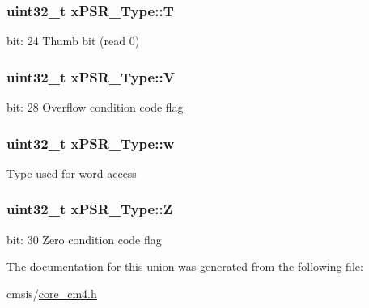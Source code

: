 \subsubsection[{\texorpdfstring{T}{T}}]{\setlength{\rightskip}{0pt plus 5cm}uint32\+\_\+t x\+P\+S\+R\+\_\+\+Type\+::T}\hypertarget{unionx_p_s_r___type_a7eed9fe24ae8d354cd76ae1c1110a658}{}\label{unionx_p_s_r___type_a7eed9fe24ae8d354cd76ae1c1110a658}
bit\+: 24 Thumb bit (read 0) 
\subsubsection[{\texorpdfstring{V}{V}}]{\setlength{\rightskip}{0pt plus 5cm}uint32\+\_\+t x\+P\+S\+R\+\_\+\+Type\+::V}\hypertarget{unionx_p_s_r___type_af14df16ea0690070c45b95f2116b7a0a}{}\label{unionx_p_s_r___type_af14df16ea0690070c45b95f2116b7a0a}
bit\+: 28 Overflow condition code flag 
\subsubsection[{\texorpdfstring{w}{w}}]{\setlength{\rightskip}{0pt plus 5cm}uint32\+\_\+t x\+P\+S\+R\+\_\+\+Type\+::w}\hypertarget{unionx_p_s_r___type_a1a47176768f45f79076c4f5b1b534bc2}{}\label{unionx_p_s_r___type_a1a47176768f45f79076c4f5b1b534bc2}
Type used for word access 
\subsubsection[{\texorpdfstring{Z}{Z}}]{\setlength{\rightskip}{0pt plus 5cm}uint32\+\_\+t x\+P\+S\+R\+\_\+\+Type\+::Z}\hypertarget{unionx_p_s_r___type_a1e5d9801013d5146f2e02d9b7b3da562}{}\label{unionx_p_s_r___type_a1e5d9801013d5146f2e02d9b7b3da562}
bit\+: 30 Zero condition code flag 

The documentation for this union was generated from the following file\+:\begin{DoxyCompactItemize}
\item 
cmsis/\hyperlink{core__cm4_8h}{core\+\_\+cm4.\+h}\end{DoxyCompactItemize}
